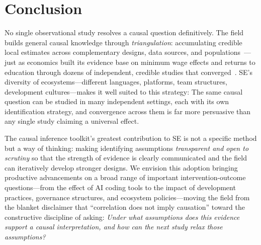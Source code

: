 \section{Conclusion}

No single observational study resolves a causal question definitively.
The field builds general causal knowledge through \emph{triangulation}: accumulating credible local estimates across complementary designs, data sources, and populations~\cite{shadish2002experimental}---just as economics built its evidence base on minimum wage effects and returns to education through dozens of independent, credible studies that converged~\cite{angrist2010credibility}.
SE's diversity of ecosystems---different languages, platforms, team structures, development cultures---makes it well suited to this strategy: The same causal question can be studied in many independent settings, each with its own identification strategy, and convergence across them is far more persuasive than any single study claiming a universal effect.

The causal inference toolkit's greatest contribution to SE is not a specific method but a way of thinking: making identifying assumptions \emph{transparent and open to scrutiny} so that the strength of evidence is clearly communicated and the field can iteratively develop stronger designs.
We envision this adoption bringing productive advancements on a broad range of important intervention-outcome questions---from the effect of AI coding tools to the impact of development practices, governance structures, and ecosystem policies---moving the field from the blanket disclaimer that ``correlation does not imply causation'' toward the constructive discipline of asking: \emph{Under what assumptions does this evidence support a causal interpretation, and how can the next study relax those assumptions?}

